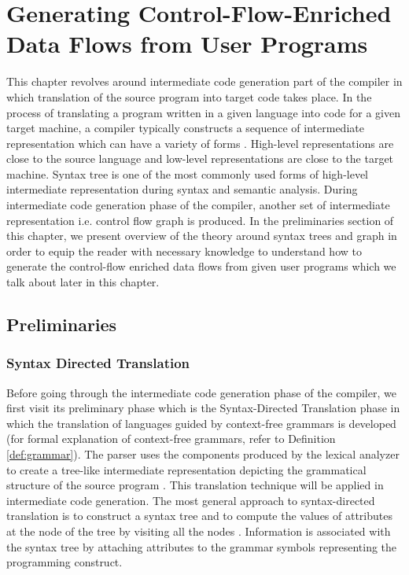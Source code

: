 \chapter{Generating Control-Flow-Enriched Data Flows from User Programs}
This chapter revolves around intermediate code generation part of the compiler in which translation of the source program into target code takes place. In the process of translating a program written in a given language into code for a given target machine, a compiler typically constructs a sequence of intermediate representation which can have a variety of forms \cite{lam2006compilers}. High-level representations are close to the source language and low-level representations are close to the target machine. Syntax tree is one of the most commonly used forms of high-level intermediate representation during syntax and semantic analysis. During intermediate code generation phase of the compiler, another set of intermediate representation i.e. control flow graph is produced. In the preliminaries section of this chapter, we present overview of the theory around syntax trees and graph in order to equip the reader with necessary knowledge to understand how to generate the control-flow enriched data flows from given user programs which we talk about later in this chapter. 

\section{Preliminaries}
\subsection{Syntax Directed Translation}
Before going through the intermediate code generation phase of the compiler, we first visit its preliminary phase which is the Syntax-Directed Translation phase in which the translation of languages guided by context-free grammars is developed (for formal explanation of context-free grammars, refer to Definition \ref{def:grammar}). The parser uses the components produced by the lexical analyzer to create a tree-like intermediate representation depicting the grammatical structure of the source program \cite{lam2006compilers}. This translation technique will be applied in intermediate code generation. The most general approach to syntax-directed translation is to construct a syntax tree and to compute the values of attributes at the node of the tree by visiting all the nodes \cite{lam2006compilers}. Information is associated with the syntax tree by attaching attributes to the grammar symbols representing the programming construct.

